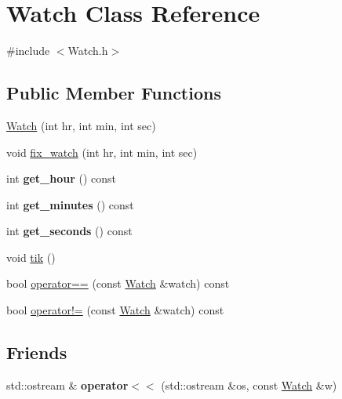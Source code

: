 \hypertarget{classWatch}{}\section{Watch Class Reference}
\label{classWatch}


{\ttfamily \#include $<$Watch.\+h$>$}

\subsection*{Public Member Functions}
\begin{DoxyCompactItemize}
\item 
\mbox{\hyperlink{classWatch_af94b86136289f216efc480468318c432}{Watch}} (int hr, int min, int sec)
\item 
void \mbox{\hyperlink{classWatch_aa798aede56936dbc09f1e64219c65016}{fix\+\_\+watch}} (int hr, int min, int sec)
\item 
\mbox{\label{classWatch_a25da86d24485ed73249612a087b087c7}} 
int {\bfseries get\+\_\+hour} () const
\item 
\mbox{\label{classWatch_aa93c6311494648687c79acf8196e3b39}} 
int {\bfseries get\+\_\+minutes} () const
\item 
\mbox{\label{classWatch_ac0795b9989a0adf33b0b4fd58bac65ba}} 
int {\bfseries get\+\_\+seconds} () const
\item 
void \mbox{\hyperlink{classWatch_abdffd11033da593f1e1fdbb4dca36a33}{tik}} ()
\item 
bool \mbox{\hyperlink{classWatch_aa985979ff68c51a6bdfb92502ee84425}{operator==}} (const \mbox{\hyperlink{classWatch}{Watch}} \&watch) const
\item 
bool \mbox{\hyperlink{classWatch_abae1587719cf25b2b8628d10e6a3826d}{operator!=}} (const \mbox{\hyperlink{classWatch}{Watch}} \&watch) const
\end{DoxyCompactItemize}
\subsection*{Friends}
\begin{DoxyCompactItemize}
\item 
\mbox{\label{classWatch_a2d293008d3ef15986dcd1ae32b1e9420}} 
std\+::ostream \& {\bfseries operator$<$$<$} (std\+::ostream \&os, const \mbox{\hyperlink{classWatch}{Watch}} \&w)
\end{DoxyCompactItemize}


